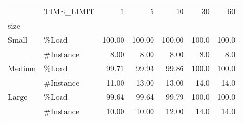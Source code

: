 \begin{tabular}{llrrrrr}
\toprule
      & TIME\_LIMIT &      1  &      5  &      10 &     30 &     60 \\
size & {} &         &         &         &        &        \\
\midrule
Small & \%Load &  100.00 &  100.00 &  100.00 &  100.0 &  100.0 \\
      & \#Instance &    8.00 &    8.00 &    8.00 &    8.0 &    8.0 \\
Medium & \%Load &   99.71 &   99.93 &   99.86 &  100.0 &  100.0 \\
      & \#Instance &   11.00 &   13.00 &   13.00 &   14.0 &   14.0 \\
Large & \%Load &   99.64 &   99.64 &   99.79 &  100.0 &  100.0 \\
      & \#Instance &   10.00 &   10.00 &   12.00 &   14.0 &   14.0 \\
\bottomrule
\end{tabular}

